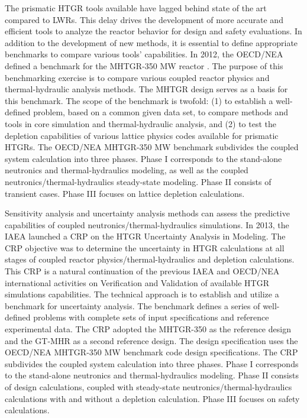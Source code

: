 The prismatic \gls{HTGR} tools available have lagged behind state of the art compared to \glspl{LWR}.
This delay drives the development of more accurate and efficient tools to analyze the reactor behavior for design and safety evaluations.
In addition to the development of new methods, it is essential to define appropriate benchmarks to compare various tools' capabilities.
In 2012, the \gls{OECD}/\gls{NEA} defined a benchmark for the \gls{MHTGR}-350 MW reactor \cite{oecd_nea_benchmark_2017}.
The purpose of this benchmarking exercise is to compare various coupled reactor physics and thermal-hydraulic analysis methods.
The MHTGR design serves as a basis for this benchmark.
The scope of the benchmark is twofold: (1) to establish a well-defined problem, based on a common given data set, to compare methods and tools in core simulation and thermal-hydraulic analysis, and (2) to test the depletion capabilities of various lattice physics codes available for prismatic \glspl{HTGR}.
The OECD/NEA MHTGR-350 MW benchmark subdivides the coupled system calculation into three phases.
Phase I corresponds to the stand-alone neutronics and thermal-hydraulics modeling, as well as the coupled neutronics/thermal-hydraulics steady-state modeling.
Phase II consists of transient cases.
Phase III focuses on lattice depletion calculations.

Sensitivity analysis and uncertainty analysis methods can assess the predictive capabilities of coupled neutronics/thermal-hydraulics simulations.
In 2013, the IAEA launched a \gls{CRP} \cite{tyobeka_htgr_2011} on the \gls{HTGR} Uncertainty Analysis in Modeling.
The \gls{CRP} objective was to determine the uncertainty in \gls{HTGR} calculations at all stages of coupled reactor physics/thermal-hydraulics and depletion calculations.
This \gls{CRP} is a natural continuation of the previous IAEA and OECD/NEA international activities \cite{iaea_evaluation_2003}\cite{reitsma_oecd-neansc_2008} on Verification and Validation of available \gls{HTGR} simulations capabilities.
The technical approach is to establish and utilize a benchmark for uncertainty analysis.
The benchmark defines a series of well-defined problems with complete sets of input specifications and reference experimental data.
The CRP adopted the MHTGR-350 as the reference design and the GT-MHR as a second reference design.
The design specification uses the OECD/NEA MHTGR-350 MW benchmark \cite{oecd_nea_benchmark_2017} code design specifications.
The CRP subdivides the coupled system calculation into three phases.
Phase I corresponds to the stand-alone neutronics and thermal-hydraulics modeling.
Phase II consists of design calculations, coupled with steady-state neutronics/thermal-hydraulics calculations with and without a depletion calculation.
Phase III focuses on safety calculations.